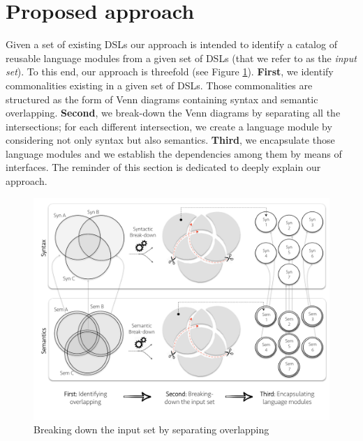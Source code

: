 \section{Proposed approach}
\label{sec:apprach}

Given a set of existing DSLs  our approach is intended to identify a catalog of reusable language modules from a given set of DSLs (that we refer to as the \textit{input set}). To this end, our approach is threefold (see Figure \ref{fig:breakingdown}). \textbf{First}, we identify commonalities existing in a given set of DSLs. Those commonalities are structured as the form of Venn diagrams containing syntax and semantic overlapping. \textbf{Second}, we break-down the Venn diagrams by separating all the intersections; for each different intersection, we create a language module by considering not only syntax but also semantics. \textbf{Third}, we encapsulate those language modules and we establish the dependencies among them by means of interfaces. The reminder of this section is dedicated to deeply explain our approach. 

\begin{figure}
\centering
\includegraphics[width=1\linewidth]{images/breakdown.pdf}
\caption{Breaking down the input set by separating overlapping}
\label{fig:breakingdown}
\end{figure}

